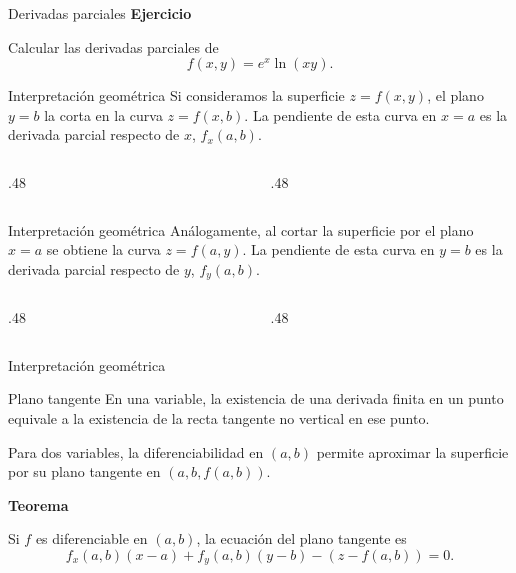 \documentclass[original_version/main.tex]{subfiles}
\begin{document}
\begin{frame}{Derivadas parciales}
\textbf{Ejercicio}\par Calcular las derivadas parciales de\[f(x,y)=e^x\ln(xy).\]
\end{frame}
\begin{frame}{Interpretación geométrica}
\small Si consideramos la superficie $z=f(x,y)$, el plano $y=b$ la corta en la curva $z=f(x,b)$. La pendiente de esta curva en $x=a$ es la derivada parcial respecto de $x$, $f_x(a,b)$.
\begin{columns}[c]\begin{column}{.48\textwidth}\end{column}\begin{column}{.48\textwidth}\end{column}\end{columns}
\end{frame}
\begin{frame}{Interpretación geométrica}
\small Análogamente, al cortar la superficie por el plano $x=a$ se obtiene la curva $z=f(a,y)$. La pendiente de esta curva en $y=b$ es la derivada parcial respecto de $y$, $f_y(a,b)$.
\begin{columns}[c]\begin{column}{.48\textwidth}\end{column}\begin{column}{.48\textwidth}\end{column}\end{columns}
\end{frame}
\begin{frame}{Interpretación geométrica}
\end{frame}
\begin{frame}{Plano tangente}
\small En una variable, la existencia de una derivada finita en un punto equivale a la existencia de la recta tangente no vertical en ese punto.
\medskip

Para dos variables, la diferenciabilidad en $(a,b)$ permite aproximar la superficie por su plano tangente en $(a,b,f(a,b))$.
\medskip

\textbf{Teorema}\par Si $f$ es diferenciable en $(a,b)$, la ecuación del plano tangente es
\[f_x(a,b)(x-a)+f_y(a,b)(y-b)-(z-f(a,b))=0.\]
\end{frame}
\end{document}
